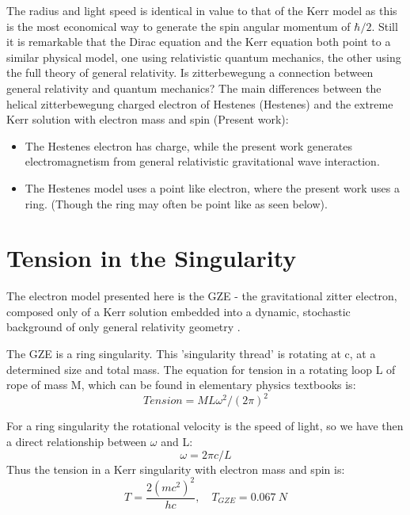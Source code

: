 \documentclass[../rzero]{subfiles}
\begin{document}
The radius and light speed is identical in value to that of the Kerr model as this is the most economical way to generate the spin angular momentum of $\hbar/2$. Still it is remarkable that the Dirac equation and the Kerr equation both point to a similar physical model, one using relativistic quantum mechanics, the other using the full theory of general relativity. Is zitterbewegung a connection between general relativity and quantum mechanics?
The main differences between the helical zitterbewegung charged electron of Hestenes (Hestenes) and the extreme Kerr solution with electron mass and spin (Present work):
\begin{itemize}
\item The Hestenes electron has charge, while the present work generates electromagnetism from general relativistic gravitational wave interaction.
\item The Hestenes model uses a point like electron, where the present work uses a ring. (Though the ring may often be point like as seen below).
\end{itemize}

\section{Tension in the Singularity}
The electron model presented here is the GZE - the gravitational zitter electron, composed only of a Kerr solution embedded into a dynamic, stochastic background of only general relativity geometry . 

The GZE is a ring singularity. This 'singularity thread' is rotating at c, at a determined size and total mass. The equation for tension in a rotating loop L of rope of mass M, which can be found in elementary physics textbooks is: 
\begin{equation}
Tension = ML\omega^2/(2\pi)^2
\end{equation}

For a ring singularity the rotational velocity is the speed of light, so we have then a direct relationship between $\omega$ and L:
\begin{equation}
\omega = 2\pi c/L
\end{equation}
Thus the tension in a Kerr singularity with electron mass and spin is:
\begin{equation}
T = \frac{2(mc^2)^2}{hc}, \quad T_{GZE} = 0.067 \ N
\end{equation}
\end{document}
